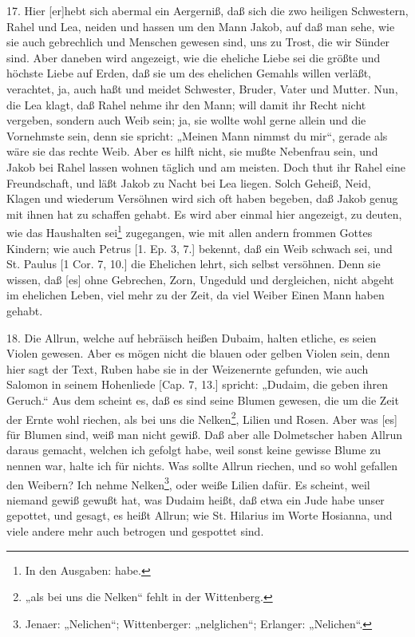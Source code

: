17. Hier [er]hebt sich abermal ein Aergerniß, daß sich die zwo heiligen Schwestern, Rahel und Lea, neiden und hassen um den Mann Jakob, auf daß man sehe, wie sie auch gebrechlich und Menschen gewesen sind, uns zu Trost, die wir Sünder sind. Aber daneben wird angezeigt, wie die eheliche Liebe sei die größte und höchste Liebe auf Erden, daß sie um des ehelichen Gemahls willen verläßt, verachtet, ja, auch haßt und meidet Schwester, Bruder, Vater und Mutter. Nun, die Lea klagt, daß Rahel nehme ihr den Mann; will damit ihr Recht nicht vergeben, sondern auch Weib sein; ja, sie wollte wohl gerne allein und die Vornehmste sein, denn sie spricht: „Meinen Mann nimmst du mir“, gerade als wäre sie das rechte Weib. Aber es hilft nicht, sie mußte Nebenfrau sein, und Jakob bei Rahel lassen wohnen täglich und am meisten. Doch thut ihr Rahel eine Freundschaft, und läßt Jakob zu Nacht bei Lea liegen. Solch Geheiß, Neid, Klagen und wiederum Versöhnen wird sich oft haben begeben, daß Jakob genug mit ihnen hat zu schaffen gehabt. Es wird aber einmal hier angezeigt, zu deuten, wie das Haushalten sei\footnote{In den Ausgaben: habe.} zugegangen, wie mit allen andern frommen Gottes Kindern; wie auch Petrus [1. Ep. 3, 7.] bekennt, daß ein Weib schwach sei, und St. Paulus [1 Cor. 7, 10.] die Ehelichen lehrt, sich selbst versöhnen. Denn sie wissen, daß [es] ohne Gebrechen, Zorn, Ungeduld und dergleichen, nicht abgeht im ehelichen Leben, viel mehr zu der Zeit, da viel Weiber Einen Mann haben gehabt.

18. Die Allrun, welche auf hebräisch heißen Dubaim, halten etliche, es seien Violen gewesen. Aber es mögen nicht die blauen oder gelben Violen sein, denn hier sagt der Text, Ruben habe sie in der Weizenernte gefunden, wie auch Salomon in seinem Hohenliede [Cap. 7, 13.] spricht: „Dudaim, die geben ihren Geruch.“ Aus dem scheint es, daß es sind seine Blumen gewesen, die um die Zeit der Ernte wohl riechen, als bei uns die Nelken\footnote{„als bei uns die Nelken“ fehlt in der Wittenberg.}, Lilien und Rosen. Aber was [es] für Blumen sind, weiß man nicht gewiß. Daß aber alle Dolmetscher haben Allrun daraus gemacht, welchen ich gefolgt habe, weil sonst keine gewisse Blume zu nennen war, halte ich für nichts. Was sollte Allrun riechen, und so wohl gefallen den Weibern? Ich nehme Nelken\footnote{Jenaer: „Nelichen“; Wittenberger: „nelglichen“; Erlanger: „Nelichen“.}, oder weiße Lilien dafür. Es scheint, weil niemand gewiß gewußt hat, was Dudaim heißt, daß etwa ein Jude habe unser gepottet, und gesagt, es heißt Allrun; wie St. Hilarius im Worte Hosianna, und viele andere mehr auch betrogen und gespottet sind.

